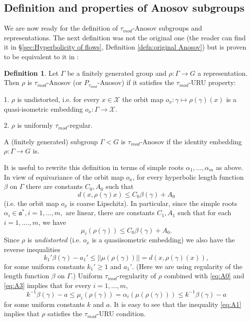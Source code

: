 \documentclass[12pt]{amsbook}%
\theoremstyle{definition}
\newtheorem{definition}[thm]{Definition}
\theoremstyle{remark}
\numberwithin{section}{chapter}
\numberwithin{subsection}{section}
\numberwithin{figure}{chapter}
\def\taumod{\tau_{mod}}
\def\cX{{\mathscr{X}}}
\def\Ga{\Gamma}
\def\ga{\gamma}
\def\al{\alpha}
\begin{document}
{{\subsection{Definition and properties of Anosov subgroups}

We are now ready for the definition of $\taumod$-Anosov subgroups and representations. 
The next definition was not the original one (the reader can find it in \S \ref{sec:Hyperbolicity of flows}, Definition \ref{defn:original Anosov}) but is proven to be equivalent to it in \cite{KLP18}: 


\begin{definition} 
Let $\Ga$ be a finitely generated group and $\rho: \Ga\to G$ a representation. Then $\rho$ is $\taumod$-Anosov 
(or $P_{\taumod}$-Anosov) if it satisfies the  $\taumod$-URU property:

1. $\rho$ is undistorted, i.e. for every $x\in \cX$ the orbit map $o_x: \ga\mapsto \rho(\ga)(x)$   
is a quasi-isometric embedding $o_x: \Ga\to \cX$. 

2. $\rho$ is uniformly $\taumod$-regular. 

A (finitely generated) subgroup $\Ga< G$ is  $\taumod$-Anosov if the identity embedding $\rho: \Ga\to G$ is. 
\end{definition}

It is useful to rewrite this definition in terms of simple roots $\al_1,...,\al_m$ as above. In view of equivariance of the orbit map 
$o_x$, for every hyperbolic length function $\beta$ on $\Ga$ there are constants $C_0, A_0$ such that
\begin{equation}\label{eq:A0}
d(x, \rho(\gamma)x)\leqslant C_0\beta(\gamma) +A_0
\end{equation}
(i.e. the orbit map $o_x$ is coarse Lipschitz). In particular,  since the simple roots 
$\alpha_i\in {\mathfrak a}^*, i=1,...,m,$ are linear, there are constants $C_1, A_1$ such that for each $i=1,....,m$, we have 
\begin{equation}\label{eq:A3}
\mu_i (\rho(\gamma)) \leqslant C_0\beta(\gamma) +A_0. 
\end{equation}
Since $\rho$ is {\em undistorted} (i.e. $o_x$  is a quasiisometric embedding) we also have the reverse inequalities 
\begin{equation}\label{eq:A2}
k_1' \beta(\gamma) - a_1'  \leqslant ||\mu(\rho(\gamma))||= d(x, \rho(\ga)(x)), 
\end{equation}
for some uniform constants $k_1'\geqslant 1$ and $a_1'$.  (Here we are using regularity of the length function $\beta$ on $\Ga$.) 
Uniform $\taumod$-regularity of $\rho$ combined with \eqref{eq:A0} and \eqref{eq:A3} 
implies that for every $i=1,...,m$, 
\begin{equation}\label{eq:A1}
k^{-1} \beta(\gamma) -a \leqslant \mu_i (\rho(\gamma))= \al_i(\mu(\rho(\ga))) \leqslant  k^{-1} \beta(\gamma) -a
\end{equation}
for some uniform constants $k$ and $a$. It is easy to see that the inequality \eqref{eq:A1} implies that $\rho$ satisfies the $\taumod$-URU condition. 

}}
\end{document}
